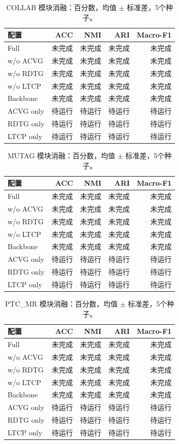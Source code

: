 \begin{table}[ht]
\centering
\caption{COLLAB 模块消融：百分数，均值 $\pm$ 标准差，5个种子。}
\begin{tabular}{lrrrr}
\hline
配置 & ACC & NMI & ARI & Macro-F1 \\
\hline
Full & 未完成 & 未完成 & 未完成 & 未完成 \\
w/o ACVG & 未完成 & 未完成 & 未完成 & 未完成 \\
w/o RDTG & 未完成 & 未完成 & 未完成 & 未完成 \\
w/o LTCP & 未完成 & 未完成 & 未完成 & 未完成 \\
Backbone & 未完成 & 未完成 & 未完成 & 未完成 \\
ACVG only & 待运行 & 待运行 & 待运行 & 待运行 \\
RDTG only & 待运行 & 待运行 & 待运行 & 待运行 \\
LTCP only & 待运行 & 待运行 & 待运行 & 待运行 \\
\hline
\end{tabular}
\end{table}

\begin{table}[ht]
\centering
\caption{MUTAG 模块消融：百分数，均值 $\pm$ 标准差，5个种子。}
\begin{tabular}{lrrrr}
\hline
配置 & ACC & NMI & ARI & Macro-F1 \\
\hline
Full & 未完成 & 未完成 & 未完成 & 未完成 \\
w/o ACVG & 未完成 & 未完成 & 未完成 & 未完成 \\
w/o RDTG & 未完成 & 未完成 & 未完成 & 未完成 \\
w/o LTCP & 未完成 & 未完成 & 未完成 & 未完成 \\
Backbone & 未完成 & 未完成 & 未完成 & 未完成 \\
ACVG only & 待运行 & 待运行 & 待运行 & 待运行 \\
RDTG only & 待运行 & 待运行 & 待运行 & 待运行 \\
LTCP only & 待运行 & 待运行 & 待运行 & 待运行 \\
\hline
\end{tabular}
\end{table}

\begin{table}[ht]
\centering
\caption{PTC\_MR 模块消融：百分数，均值 $\pm$ 标准差，5个种子。}
\begin{tabular}{lrrrr}
\hline
配置 & ACC & NMI & ARI & Macro-F1 \\
\hline
Full & 未完成 & 未完成 & 未完成 & 未完成 \\
w/o ACVG & 未完成 & 未完成 & 未完成 & 未完成 \\
w/o RDTG & 未完成 & 未完成 & 未完成 & 未完成 \\
w/o LTCP & 未完成 & 未完成 & 未完成 & 未完成 \\
Backbone & 未完成 & 未完成 & 未完成 & 未完成 \\
ACVG only & 待运行 & 待运行 & 待运行 & 待运行 \\
RDTG only & 待运行 & 待运行 & 待运行 & 待运行 \\
LTCP only & 待运行 & 待运行 & 待运行 & 待运行 \\
\hline
\end{tabular}
\end{table}
